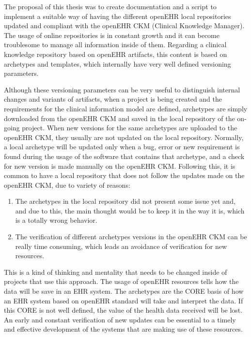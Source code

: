 \documentclass[mim_thesis.tex]{subfiles}
\begin{document}
The proposal of this thesis was to create documentation and a script to implement a suitable way of having the different openEHR local repositories updated and compliant with the openEHR CKM (Clinical Knowledge Manager).\\   

The usage of online repositories is in constant growth and it can become troublesome to manage all information inside of them. Regarding a clinical knowledge repository based on openEHR artifacts, this content is based on archetypes and templates, which internally have very well defined versioning parameters.

Although these versioning parameters can be very useful to distinguish internal changes and variants of artifacts, when a project is being created and the requirements for the clinical information model are defined, archetypes are simply downloaded from the openEHR CKM and saved in the local repository of the on-going project. When new versions for the same archetypes are uploaded to the openEHR CKM, they usually are not updated on the local repository. Normally, a local archetype will be updated only when a bug, error or new requirement is found during the usage of the software that contains that archetype, and a check for new version is made manually on the openEHR CKM. Following this, it is common to have a local repository that does not follow the updates made on the openEHR CKM, due to variety of reasons: 

\begin{enumerate}[noitemsep]
\item The archetypes in the local repository did not present some issue yet and, and due to this, the main thought would be to keep it in the way it is, which is a totally wrong behavior. 
\item The verification of different archetypes versions in the openEHR CKM can be really time consuming, which leads an avoidance of verification for new resources.
\end{enumerate}

This is a kind of thinking and mentality that needs to be changed inside of projects that use this approach. The usage of openEHR resources tells how the data will be save in an EHR system. The archetypes are the CORE basis of how an EHR system based on openEHR standard will take and interpret the data. If this CORE is not well defined, the value of the health data received will be lost. An early and constant verification of new updates can be essential to a timely and effective development of the systems that are making use of these resources.
\end{document}
